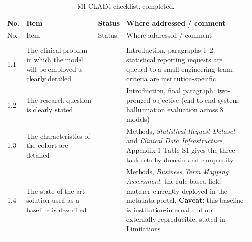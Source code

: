 \documentclass[10pt]{article}
\newcommand{\Y}{\checkmark}
\begin{document}
\begingroup\footnotesize
\begin{longtable}{@{}L{0.7cm}L{7.4cm}C{1.4cm}L{5.4cm}@{}}
\caption{MI-CLAIM checklist, completed.}\\
\toprule
No. & Item & Status & Where addressed / comment\\
\midrule
\endfirsthead
\toprule
No. & Item & Status & Where addressed / comment\\
\midrule
\endhead
\bottomrule
\endfoot
\bottomrule
\endlastfoot

\\
1.1 & The clinical problem in which the model will be employed is clearly detailed & \Y & Introduction, paragraphs 1--2: statistical reporting requests are queued to a small engineering team; criteria are institution-specific\\
1.2 & The research question is clearly stated & \Y & Introduction, final paragraph: two-pronged objective (end-to-end system; hallucination evaluation across 8 models)\\
1.3 & The characteristics of the cohort are detailed & \Y & Methods, \emph{Statistical Request Dataset} and \emph{Clinical Data Infrastructure}; Appendix 1 Table S1 gives the three task sets by domain and complexity\\
1.4 & The state of the art solution used as a baseline is described & \Y & Methods, \emph{Business Term Mapping Assessment}: the rule-based field matcher currently deployed in the metadata portal. \textbf{Caveat:} this baseline is institution-internal and not externally reproducible; stated in Limitations\\
\addlinespace


\end{longtable}
\end{document}
